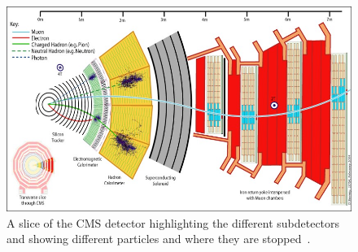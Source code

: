 \begin{figure}
\centering
\includegraphics[width=\linewidth]{Figures/CMSlayout.jpg}
\caption{A slice of the CMS detector highlighting the different subdetectors and showing different particles and where they are stopped~\cite{Davis}.}
\label{fig:CMSlayout}
\end{figure}

